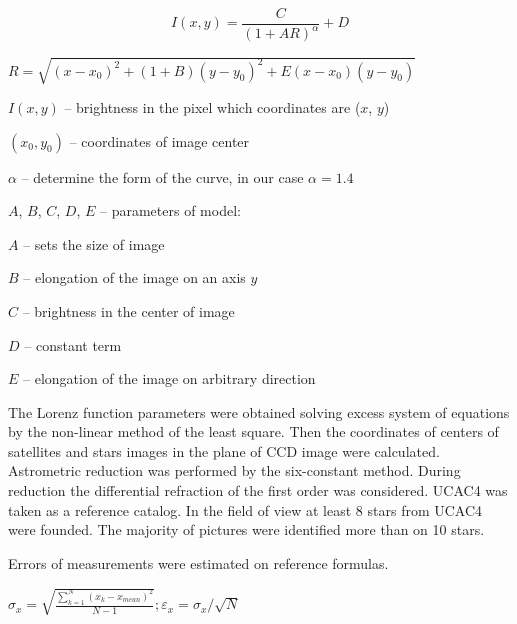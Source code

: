 \documentclass[]{article}
\begin{document}
\begin{equation}
\label{1}
I(x,y) = \frac{C}{(1 + AR)^{\alpha}} + D
\end{equation}
\begin{center}
\begin{math}
R = \sqrt{(x-x_0)^2 + (1+B)(y-y_0)^2 +E(x-x_0)(y-y_0)}
\end{math}\\
\end{center}
$I(x,y)$ -- brightness in the pixel which coordinates are ($x$, $y$)\par
$(x_0, y_0)$ -- coordinates of image center\par
$\alpha$ --  determine the form of the curve, in our case $\alpha = 1.4$\par
$A$, $B$, $C$, $D$, $E$ -- parameters of model:\par
$A$ -- sets the size of image\par
$B$ -- elongation of the image on an axis $y$\par
$C$ -- brightness in the center of image\par
$D$ -- constant term\par
$E$ -- elongation of the image on arbitrary direction\par
\vskip0.1cm

The Lorenz function parameters were obtained  solving excess system of equations by the non-linear method of the least square. Then the coordinates of centers of satellites and stars images in the plane of CCD image were calculated. Astrometric reduction was performed by the six-constant method. During reduction the differential refraction of the first order was considered. UCAC4 was taken as a reference catalog. In the field of view at least 8 stars from UCAC4 were founded. The majority of pictures were identified more than on 10 stars. \par
Errors of measurements were estimated on reference formulas.

\begin{math}
\sigma_x = \sqrt{\frac{\sum\limits_{k=1}^{N}(x_k-x_{mean})^2}{N-1}}; \varepsilon_x = \sigma_x/\sqrt{N}
\end{math}\\
\end{document}
